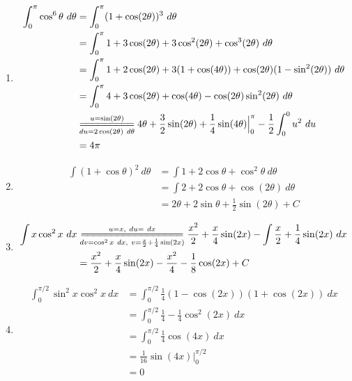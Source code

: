 \documentclass[a4]{article}
\begin{document}
\begin{enumerate}[label={\bf{}\arabic*}.]
\item%
	\begin{align*}
	\int_0^\pi\cos^6\theta\ d\theta&=\int_0^\pi(1+\cos(2\theta))^3\ d\theta\\
	&=\int_0^\pi1+3\cos(2\theta)+3\cos^2(2\theta)+\cos^3(2\theta)\ d\theta\\
	&=\int_0^\pi1+2\cos(2\theta)+3(1+\cos(4\theta))+\cos(2\theta)(1-\sin^2(2\theta))\ d\theta\\
	&=\int_0^\pi4+3\cos(2\theta)+\cos(4\theta)-\cos(2\theta)\sin^2(2\theta)\ d\theta\\
	&\overset{u=\sin(2\theta)}{\underset{du=2\cos(2\theta)\ d\theta}{=\joinrel=\joinrel=\joinrel=\joinrel=\joinrel=\joinrel=\joinrel=\joinrel=}}4\theta+\frac{3}{2}\sin(2\theta)+\frac{1}{4}\sin(4\theta)\Big|_0^\pi-\frac{1}{2}\int_0^0 u^2\ du\\
	&=4\pi
	\end{align*}

\item%
	\begin{align*}
	\int(1+\cos\theta)^2\ d\theta&=\int1+2\cos\theta+\cos^2\theta\ d\theta\\
	&=\int2+2\cos\theta+\cos(2\theta)\ d\theta\\
	&=2\theta+2\sin\theta+\frac{1}{2}\sin(2\theta)+C
	\end{align*}

\item%
	\begin{align*}
	\int x\cos^2x\ dx&\overset{u=x,\ du=\ dx}{\underset{dv=\cos^2x\ dx,\ v=\frac{x}{2}+\frac{1}{4}\sin(2x)}{=\joinrel=\joinrel=\joinrel=\joinrel=\joinrel=\joinrel=\joinrel=\joinrel=\joinrel=\joinrel=\joinrel=\joinrel=\joinrel=\joinrel=\joinrel=\joinrel=}}\frac{x^2}{2}+\frac{x}{4}\sin(2x)-\int\frac{x}{2}+\frac{1}{4}\sin(2x)\ dx\\
	&=\frac{x^2}{2}+\frac{x}{4}\sin(2x)-\frac{x^2}{4}-\frac{1}{8}\cos(2x)+C
	\end{align*}

\color{red}\item[\refstepcounter{enumi}\fbox{\number\value{enumi}.}]\color{black}%
	\begin{align*}
	\int_0^{\pi/2}\sin^2x\cos^2x\ dx&=\int_0^{\pi/2}\frac{1}{4}(1-\cos(2x))(1+\cos(2x))\ dx\\
	&=\int_0^{\pi/2}\frac{1}{4}-\frac{1}{4}\cos^2(2x)\ dx\\
	&=\int_0^{\pi/2}\frac{1}{4}\cos(4x)\ dx\\
	&=\frac{1}{16}\sin(4x)\Big|_0^{\pi/2}\\
	&=0
	\end{align*}


\end{enumerate}
\end{document}
